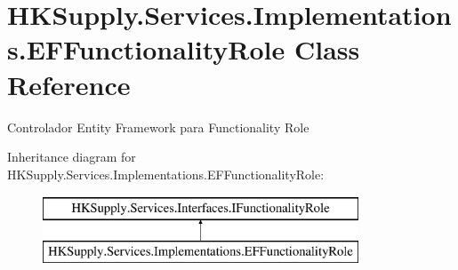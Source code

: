 \hypertarget{class_h_k_supply_1_1_services_1_1_implementations_1_1_e_f_functionality_role}{}\section{H\+K\+Supply.\+Services.\+Implementations.\+E\+F\+Functionality\+Role Class Reference}
\label{class_h_k_supply_1_1_services_1_1_implementations_1_1_e_f_functionality_role}


Controlador Entity Framework para Functionality Role  


Inheritance diagram for H\+K\+Supply.\+Services.\+Implementations.\+E\+F\+Functionality\+Role\+:\begin{figure}[H]
\begin{center}
\leavevmode
\includegraphics[height=2.000000cm]{class_h_k_supply_1_1_services_1_1_implementations_1_1_e_f_functionality_role}
\end{center}
\end{figure}
